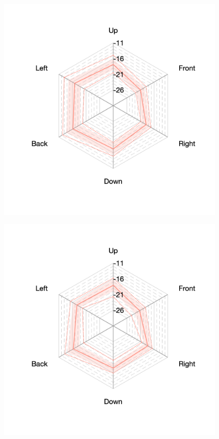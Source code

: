 \documentclass[11pt,a4j]{jreport}
\begin{document}
\begin{figure}[H]
  \begin{minipage}[b]{.33\textwidth}
    \hspace{1 \linewidth}
  \end{minipage}%
  \begin{minipage}[b]{.33\textwidth}
    \centering
    \includegraphics[width=1\linewidth]{images/realHallDirSt/early_S10_allhall.png}
    \label{fig:S10early}
  \end{minipage}%
  \begin{minipage}[b]{.33\textwidth}
    \centering
    \includegraphics[width=1\linewidth]{images/realHallDirSt/early_S09_allhall.png}
    \label{fig:S09early}
  \end{minipage}


\end{figure}
\end{document}
